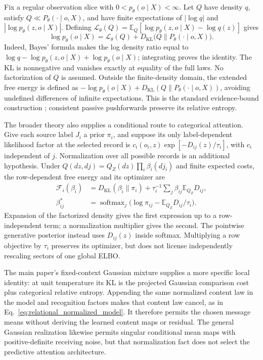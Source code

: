 \documentclass[twoside,11pt]{article}
\begin{document}
Fix a regular observation slice with $0<p_\theta(o\mid X)<\infty$. Let $Q$ have density $q$, satisfy $Q\ll P_\theta(\cdot\mid o,X)$, and have finite expectations of $|\log q|$ and $|\log p_\theta(z,o\mid X)|$. Defining $\mathcal L_\theta(Q)=\mathbb E_Q[\log p_\theta(z,o\mid X)-\log q(z)]$ gives
\begin{equation}
\log p_\theta(o\mid X)=\mathcal L_\theta(Q)+D_{\mathrm{KL}}\bigl(Q\|P_\theta(\cdot\mid o,X)\bigr).
\label{eq:rg_bridge_elbo}
\end{equation}
Indeed, Bayes' formula makes the log density ratio equal to $\log q-\log p_\theta(z,o\mid X)+\log p_\theta(o\mid X)$; integrating proves the identity. The KL is nonnegative and vanishes exactly at equality of the full laws. No factorization of $Q$ is assumed. Outside the finite-density domain, the extended free energy is defined as $-\log p_\theta(o\mid X)+D_{\mathrm{KL}}(Q\|P_\theta(\cdot\mid o,X))$, avoiding undefined differences of infinite expectations. This is the standard evidence-bound construction \citep{Blei2017}; consistent passive pushforwards preserve its relative entropy.

The broader theory also supplies a conditional route to categorical attention. Give each source label $J_i$ a prior $\pi_i$, and suppose its only label-dependent likelihood factor at the selected record is $c_i(o_i,z)\exp[-D_{ij}(z)/\tau_i]$, with $c_i$ independent of $j$. Normalization over all possible records is an additional hypothesis. Under $Q(dz,dj)=Q_Z(dz)\prod_i\beta_i(dj_i)$ and finite expected costs, the row-dependent free energy and its optimizer are
\begin{align}
\mathcal F_i(\beta_i)&=D_{\mathrm{KL}}(\beta_i\|\pi_i)+\tau_i^{-1}\sum_j\beta_{ij}\mathbb E_{Q_Z}D_{ij},\\
\beta_{ij}^*&=\operatorname{softmax}_j\bigl(\log\pi_{ij}-\mathbb E_{Q_Z}D_{ij}/\tau_i\bigr).
\label{eq:rg_bridge_row}
\end{align}
Expansion of the factorized density gives the first expression up to a row-independent term; a normalization multiplier gives the second. The pointwise generative posterior instead uses $D_{ij}(z)$ inside softmax. Multiplying a row objective by $\tau_i$ preserves its optimizer, but does not license independently rescaling sectors of one global ELBO.

The main paper's fixed-context Gaussian mixture supplies a more specific local identity: at unit temperature its KL is the projected Gaussian comparison cost plus categorical relative entropy. Appending the same normalized content law in the model and recognition factors makes that content law cancel, as in Eq.~\eqref{eq:relational_normalized_model}. It therefore permits the chosen message means without deriving the learned content maps or residual. The general Gaussian realization likewise permits singular conditional mean maps with positive-definite receiving noise, but that normalization fact does not select the predictive attention architecture.
\end{document}
